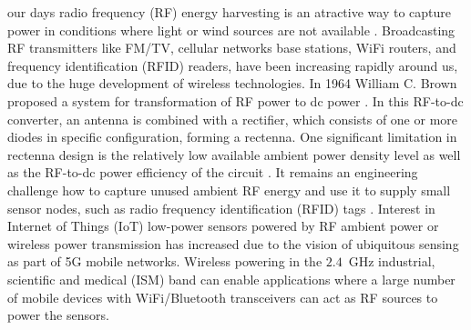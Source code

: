 \documentclass[journal]{IEEEtran}
\begin{document}
 our days  radio frequency (RF) energy harvesting is an atractive way to capture power in  conditions where  light or wind sources are not available \cite{shinohara2011power,  pinuela2013ambient, niotaki2014solar, kim2014ambient}. 
%
Broadcasting RF transmitters like FM/TV, cellular networks base stations, WiFi routers, and frequency identification (RFID) readers, have been increasing rapidly around us, due to the huge development of  wireless technologies.
%
In 1964 William C. Brown proposed  a system for transformation of RF power to dc power  \cite{brown1984history}. 
%
In this  RF-to-dc converter, an antenna is combined with a rectifier, which  consists of one or more diodes in specific configuration, forming a rectenna.
%
One significant  limitation in  rectenna design is
the relatively low available ambient power density level as well as the RF-to-dc power efficiency of the circuit \cite{valenta2014harvesting,kim2014ambient}.
%
%
%
It remains an engineering challenge how to capture unused ambient RF energy and use it to supply small sensor nodes, such as radio frequency identification (RFID) tags \cite{kim2014ambient, assimonis2015sensitive, kotani2009high}.
%
%
%
Interest in Internet of Things (IoT) low-power sensors powered by RF ambient power or wireless power transmission has increased due to the vision of ubiquitous sensing as part of 5G mobile networks.
%
Wireless powering in the $2.4$~GHz  industrial, scientific and medical  (ISM) band can enable
applications where a large number of mobile devices with WiFi/Bluetooth transceivers can act as RF sources to power the  sensors. 
%
\end{document}
